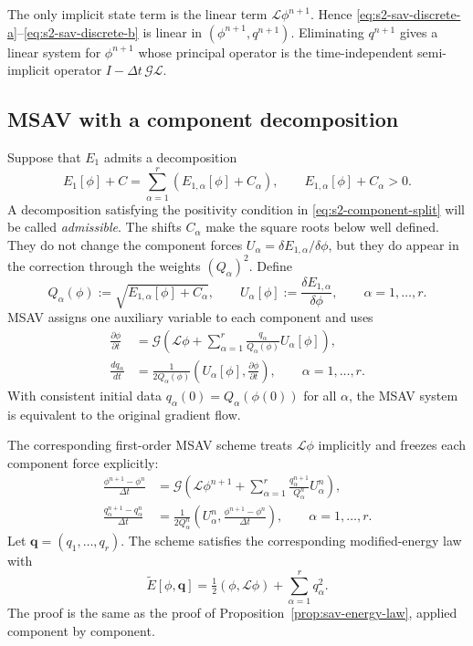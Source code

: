 \documentclass[10pt,onefignum,onetabnum,hidelinks]{siamart251216}
\begin{document}
The only implicit state term is the linear term $\mathcal L\phi^{n+1}$. Hence \eqref{eq:s2-sav-discrete-a}--\eqref{eq:s2-sav-discrete-b} is linear in $(\phi^{n+1},q^{n+1})$. Eliminating $q^{n+1}$ gives a linear system for $\phi^{n+1}$ whose principal operator is the time-independent semi-implicit operator $I-\Delta t\,\mathcal G\mathcal L$.

\subsection{MSAV with a component decomposition}
\label{subsec:msav}

Suppose that $E_1$ admits a decomposition
\begin{equation}
E_1[\phi]+C
=
\sum_{\alpha=1}^r
\left(E_{1,\alpha}[\phi]+C_\alpha\right),
\qquad
E_{1,\alpha}[\phi]+C_\alpha>0.
\label{eq:s2-component-split}
\end{equation}
A decomposition satisfying the positivity condition in \eqref{eq:s2-component-split} will be called \emph{admissible}. The shifts $C_\alpha$ make the square roots below well defined. They do not change the component forces $U_\alpha=\delta E_{1,\alpha}/\delta\phi$, but they do appear in the correction through the weights $(Q_\alpha)^2$. Define
\begin{equation}
Q_\alpha(\phi)
:=
\sqrt{E_{1,\alpha}[\phi]+C_\alpha},
\qquad
U_\alpha[\phi]
:=
\frac{\delta E_{1,\alpha}}{\delta\phi},
\qquad
\alpha=1,\dots,r.
\label{eq:s2-msav-q}
\end{equation}
MSAV assigns one auxiliary variable to each component and uses
\begin{align}
\frac{\partial \phi}{\partial t}
&=
\mathcal G\left(
\mathcal L\phi
+
\sum_{\alpha=1}^r
\frac{q_\alpha}{Q_\alpha(\phi)}
U_\alpha[\phi]
\right),
\label{eq:s2-msav-cont-a}
\\
\frac{dq_\alpha}{dt}
&=
\frac{1}{2Q_\alpha(\phi)}
\left(
U_\alpha[\phi],\frac{\partial\phi}{\partial t}
\right),
\qquad
\alpha=1,\dots,r.
\label{eq:s2-msav-cont-b}
\end{align}
With consistent initial data $q_\alpha(0)=Q_\alpha(\phi(0))$ for all $\alpha$, the MSAV system is equivalent to the original gradient flow.

The corresponding first-order MSAV scheme treats $\mathcal L\phi$ implicitly and freezes each component force explicitly:
\begin{align}
\frac{\phi^{n+1}-\phi^n}{\Delta t}
&=
\mathcal G\left(
\mathcal L\phi^{n+1}
+
\sum_{\alpha=1}^r
\frac{q_\alpha^{n+1}}{Q_\alpha^n}
U_\alpha^n
\right),
\label{eq:s2-msav-discrete-a}
\\
\frac{q_\alpha^{n+1}-q_\alpha^n}{\Delta t}
&=
\frac{1}{2Q_\alpha^n}
\left(
U_\alpha^n,\frac{\phi^{n+1}-\phi^n}{\Delta t}
\right),
\qquad
\alpha=1,\dots,r.
\label{eq:s2-msav-discrete-b}
\end{align}
Let \(\mathbf q=(q_1,\dots,q_r)\). The scheme satisfies the corresponding
modified-energy law with
\[
\widetilde E[\phi,\mathbf q]
=
\tfrac12(\phi,\mathcal L\phi)
+
\sum_{\alpha=1}^r q_\alpha^2.
\]
The proof is the same as the proof of Proposition~\ref{prop:sav-energy-law}, applied component by component.
\end{document}
